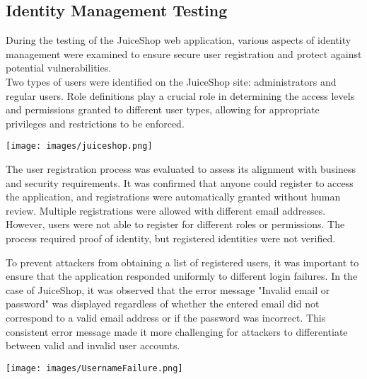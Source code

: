 \documentclass[12pt]{article}
\begin{document}
\subsection{Identity Management Testing}
During the testing of the JuiceShop web application, various aspects of identity management were examined to ensure secure user registration and protect against potential vulnerabilities.\\

Two types of users were identified on the JuiceShop site: administrators and regular users. Role definitions play a crucial role in determining the access levels and permissions granted to different user types, allowing for appropriate privileges and restrictions to be enforced.\\

\begin{center}
    \texttt{[image: images/juiceshop.png]}
\end{center}



The user registration process was evaluated to assess its alignment with business and security requirements. It was confirmed that anyone could register to access the application, and registrations were automatically granted without human review. Multiple registrations were allowed with different email addresses. However, users were not able to register for different roles or permissions. The process required proof of identity, but registered identities were not verified.\\

\newpage

To prevent attackers from obtaining a list of registered users, it was important to ensure that the application responded uniformly to different login failures. In the case of JuiceShop, it was observed that the error message "Invalid email or password" was displayed regardless of whether the entered email did not correspond to a valid email address or if the password was incorrect. This consistent error message made it more challenging for attackers to differentiate between valid and invalid user accounts.\\

\begin{center}
    \texttt{[image: images/UsernameFailure.png]}
\end{center}
\end{document}
